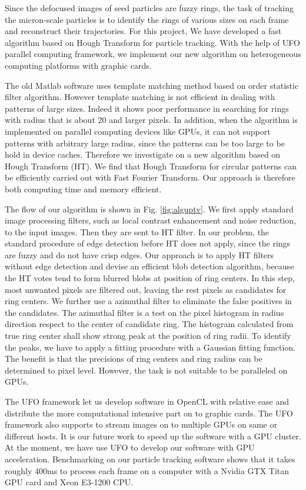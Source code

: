 \documentclass{article}
\begin{document}
Since the defocused images of seed particles are fuzzy rings, the task of
tracking the micron-scale particles is to identify the rings of various sizes
on each frame and reconstruct their trajectories. For this project, We have
developed a fast algorithm based on Hough Transform for particle tracking.
With the help of UFO parallel computing framework, we implement our new algorithm on
heterogeneous computing platforms with graphic cards. 


The old Matlab software uses template matching method based on order statistic
filter algorithm. However template matching is not efficient in dealing with
patterns of large sizes. Indeed it shows poor performance in searching for
rings with radius that is about 20 and larger pixels. In addition, when the
algorithm is implemented on parallel computing devices like GPUs, it can not
support patterns with arbitrary large radius, since the patterns can be too
large to be hold in device caches. Therefore we investigate on a new algorithm
based on Hough Transform (HT). We find that Hough Transform for circular
patterns can be efficiently carried out with Fast Fourier Transform. Our
approach is therefore both computing time and memory efficient.

The flow of our algorithm is shown in Fig. \ref{fig:alguptv}.  We first apply
standard image processing filters, such as local contrast enhancement and noise
reduction, to the input images. Then they are sent to HT filter. In our
problem, the standard procedure of edge detection before HT does not apply,
since the rings are fuzzy and do not have crisp edges. Our approach is to apply
HT filters without edge detection and devise an efficient blob detection
algorithm, because the HT votes tend to form blurred blobs at position of ring
centers.  In this step, most unwanted pixels are filtered out, leaving the rest
pixels as candidates for ring centers.  We further use a azimuthal filter to
eliminate the false positives in the candidates. The azimuthal filter is a test
on the pixel histogram in radius direction respect to the center of candidate
ring. The histogram calculated from true ring center shall show strong peak at
the position of ring radii. To identify the peaks, we have to apply a fitting
procedure with a Gaussian fitting function. The benefit is that the precisions
of ring centers and ring radius can be determined to pixel level. However,
the task is not suitable to be paralleled on GPUs.

The UFO framework let us develop software in OpenCL with relative ease and
distribute the more computational intensive part on to graphic cards. The UFO
framework also supports to stream images on to multiple GPUs on same or
different hosts.  It is our future work to speed up the software with a GPU
cluster. At the moment, we have use UFO to develop our software with GPU
acceleration.  Benchmarking on our particle tracking software shows that it
takes roughly 400ms to process each frame on a computer with a Nvidia GTX Titan
GPU card and Xeon E3-1200 CPU.  
\end{document}
